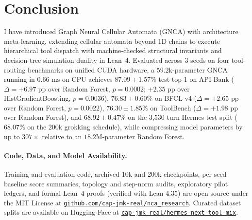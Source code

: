\documentclass[10pt,twocolumn,letterpaper]{article}
\begin{document}
\section{Conclusion}
I have introduced Graph Neural Cellular Automata (GNCA) with architecture meta-learning, extending cellular automata beyond 1D chains to execute hierarchical tool dispatch with machine-checked structural invariants and decision-tree simulation duality in Lean~4. Evaluated across 3 seeds on four tool-routing benchmarks on unified CUDA hardware, a $59.2\text{k}$-parameter GNCA running in $0.66\text{ ms}$ on CPU achieves $\mathbf{87.09 \pm 1.57\%}$ test top-1 on API-Bank ($\Delta = +6.97\text{ pp}$ over Random Forest, $p=0.0002$; $+2.35\text{ pp}$ over HistGradientBoosting, $p=0.0036$), $\mathbf{76.83 \pm 0.60\%}$ on BFCL v4 ($\Delta = +2.65\text{ pp}$ over Random Forest, $p=0.0022$), $\mathbf{76.30 \pm 1.85\%}$ on ToolBench ($\Delta = +1.98\text{ pp}$ over Random Forest), and $\mathbf{68.92 \pm 0.47\%}$ on the 3{,}530-turn Hermes test split ($68.07\%$ on the 200k grokking schedule), while compressing model parameters by up to $307\times$ relative to an $18.2\text{M}$-parameter Random Forest.

\paragraph{Code, Data, and Model Availability.}
{\small
Training and evaluation code, archived 10k and 200k checkpoints, per-seed baseline score summaries, topology and step-norm audits, exploratory pilot ledgers, and formal Lean~4 proofs (verified with Lean 4.35) are open source under the MIT License at \href{https://github.com/cap-jmk-real/nca_research}{\nolinkurl{github.com/cap-jmk-real/nca_research}}.
Curated dataset splits are available on Hugging Face at \href{https://huggingface.co/datasets/cap-jmk-real/hermes-next-tool-mix}{\nolinkurl{cap-jmk-real/hermes-next-tool-mix}}.}
\end{document}
